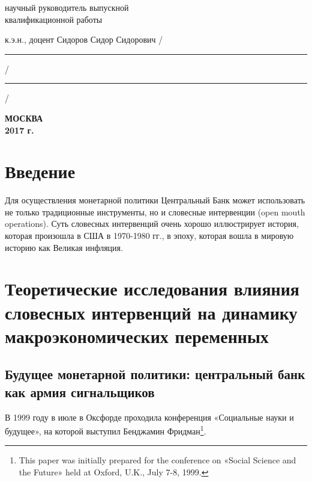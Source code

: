 \documentclass[12pt,a4paper, oneside]{extreport}
\begin{document}
\noindent
научный руководитель выпускной \\
квалификационной работы

\noindent
к.э.н., доцент Сидоров Сидор Сидорович
\hfill /\rule{6em}{0.5pt}/\rule{6em}{0.5pt}/

\hfill{}

%
%

\vfill

\begin{center}
\normalsize \bfseries МОСКВА \\ 2017 г.
\end{center}
\endgroup




\tableofcontents  %



\chapter*{Введение}


Для осуществления монетарной политики Центральный Банк может использовать не только традиционные инструменты, но и словесные интервенции (open mouth operations). Суть словесных интервенций очень хорошо иллюстрирует история, которая произошла в США в 1970-1980 гг., в эпоху, которая вошла в мировую историю как Великая инфляция.


\chapter{Теоретические исследования влияния словесных интервенций на динамику макроэкономических переменных}

\section{Будущее монетарной политики: центральный банк как армия сигнальщиков}

В 1999 году в июле в Оксфорде проходила конференция «Социальные науки и будущее», на которой выступил Бенджамин Фридман\footnote{This paper was initially prepared for the conference on «Social Science and the Future» held at Oxford, U.K., July 7-8, 1999.}.
\end{document}
